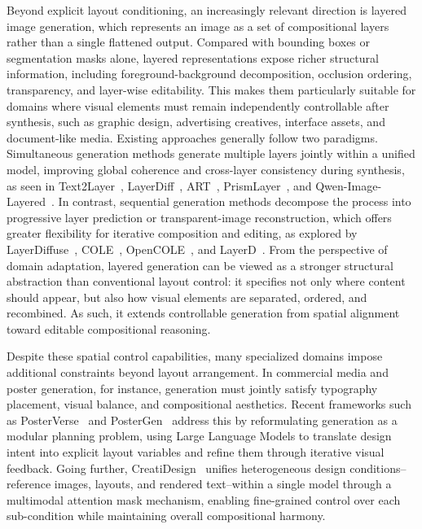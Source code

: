 Beyond explicit layout conditioning, an increasingly relevant direction is layered image generation, which represents an image as a set of compositional layers rather than a single flattened output. Compared with bounding boxes or segmentation masks alone, layered representations expose richer structural information, including foreground-background decomposition, occlusion ordering, transparency, and layer-wise editability. This makes them particularly suitable for domains where visual elements must remain independently controllable after synthesis, such as graphic design, advertising creatives, interface assets, and document-like media. Existing approaches generally follow two paradigms. Simultaneous generation methods generate multiple layers jointly within a unified model, improving global coherence and cross-layer consistency during synthesis, as seen in Text2Layer~\citep{zhang2023text2layer}, LayerDiff~\citep{huang2024layerdiff}, ART~\citep{pu2025art}, PrismLayer~\citep{chen2025prismlayers}, and Qwen-Image-Layered~\citep{yin2025qwenimagelayered}. In contrast, sequential generation methods decompose the process into progressive layer prediction or transparent-image reconstruction, which offers greater flexibility for iterative composition and editing, as explored by LayerDiffuse~\citep{zhang2024transparent}, COLE~\citep{jia2023cole}, OpenCOLE~\citep{inoue2024opencole}, and LayerD~\citep{suzuki2025layerd}. From the perspective of domain adaptation, layered generation can be viewed as a stronger structural abstraction than conventional layout control: it specifies not only where content should appear, but also how visual elements are separated, ordered, and recombined. As such, it extends controllable generation from spatial alignment toward editable compositional reasoning.

Despite these spatial control capabilities, many specialized domains impose additional constraints beyond layout arrangement. In commercial media and poster generation, for instance, generation must jointly satisfy typography placement, visual balance, and compositional aesthetics. Recent frameworks such as PosterVerse~\citep{Liu2026PosterVerseAF} and PosterGen~\citep{Zhang2025PosterGenAP} address this by reformulating generation as a modular planning problem, using Large Language Models to translate design intent into explicit layout variables and refine them through iterative visual feedback. Going further, CreatiDesign~\citep{zhang2025creatidesign} unifies heterogeneous design conditions--reference images, layouts, and rendered text--within a single model through a multimodal attention mask mechanism, enabling fine-grained control over each sub-condition while maintaining overall compositional harmony.



